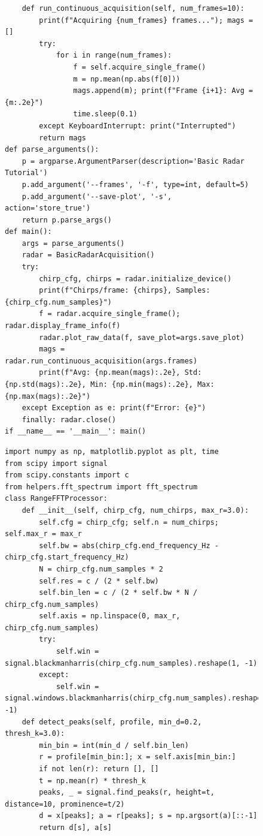 \begin{figure}[H]
\centering
\begin{verbatim}
    def run_continuous_acquisition(self, num_frames=10):
        print(f"Acquiring {num_frames} frames..."); mags = []
        try:
            for i in range(num_frames):
                f = self.acquire_single_frame()
                m = np.mean(np.abs(f[0]))
                mags.append(m); print(f"Frame {i+1}: Avg = {m:.2e}")
                time.sleep(0.1)
        except KeyboardInterrupt: print("Interrupted")
        return mags
def parse_arguments():
    p = argparse.ArgumentParser(description='Basic Radar Tutorial')
    p.add_argument('--frames', '-f', type=int, default=5)
    p.add_argument('--save-plot', '-s', action='store_true')
    return p.parse_args()
def main():
    args = parse_arguments()
    radar = BasicRadarAcquisition()
    try:
        chirp_cfg, chirps = radar.initialize_device()
        print(f"Chirps/frame: {chirps}, Samples: {chirp_cfg.num_samples}")
        f = radar.acquire_single_frame(); radar.display_frame_info(f)
        radar.plot_raw_data(f, save_plot=args.save_plot)
        mags = radar.run_continuous_acquisition(args.frames)
        print(f"Avg: {np.mean(mags):.2e}, Std: {np.std(mags):.2e}, Min: {np.min(mags):.2e}, Max: {np.max(mags):.2e}")
    except Exception as e: print(f"Error: {e}")
    finally: radar.close()
if __name__ == '__main__': main()
\end{verbatim}
\end{figure}



\newpage
{}

\begin{figure}[H]
\centering
\begin{verbatim}
import numpy as np, matplotlib.pyplot as plt, time
from scipy import signal
from scipy.constants import c
from helpers.fft_spectrum import fft_spectrum
class RangeFFTProcessor:
    def __init__(self, chirp_cfg, num_chirps, max_r=3.0):
        self.cfg = chirp_cfg; self.n = num_chirps; self.max_r = max_r
        self.bw = abs(chirp_cfg.end_frequency_Hz - chirp_cfg.start_frequency_Hz)
        N = chirp_cfg.num_samples * 2
        self.res = c / (2 * self.bw)
        self.bin_len = c / (2 * self.bw * N / chirp_cfg.num_samples)
        self.axis = np.linspace(0, max_r, chirp_cfg.num_samples)
        try:
            self.win = signal.blackmanharris(chirp_cfg.num_samples).reshape(1, -1)
        except:
            self.win = signal.windows.blackmanharris(chirp_cfg.num_samples).reshape(1, -1) 
    def detect_peaks(self, profile, min_d=0.2, thresh_k=3.0):
        min_bin = int(min_d / self.bin_len)
        r = profile[min_bin:]; x = self.axis[min_bin:]
        if not len(r): return [], []
        t = np.mean(r) * thresh_k
        peaks, _ = signal.find_peaks(r, height=t, distance=10, prominence=t/2)
        d = x[peaks]; a = r[peaks]; s = np.argsort(a)[::-1]
        return d[s], a[s]

\end{verbatim}
\end{figure}

